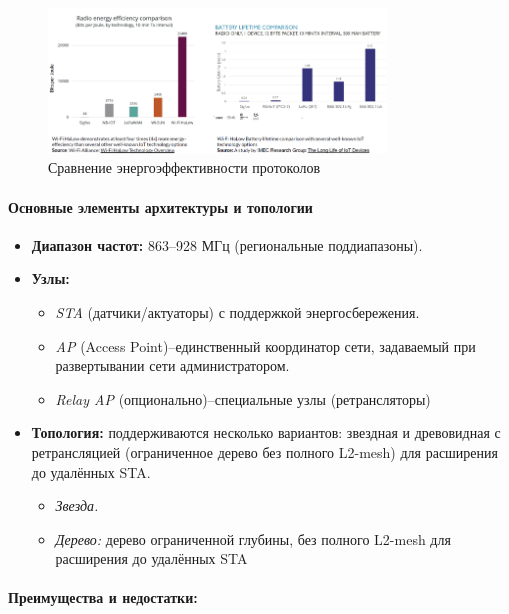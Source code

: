 \documentclass[14pt, a4paper]{extreport}
\begin{document}
\begin{figure}[ht]
    \centering
    \includegraphics[width=0.8\textwidth]{images/WiFiEnergyEff.png}
    \caption{Сравнение энергоэффективности протоколов \cite{IMG_protocol_compare_power_eff}}
    \label{fig:wifi_energy_eff}
\end{figure}

\paragraph{Основные элементы архитектуры и топологии}
\begin{itemize}
  \item \textbf{Диапазон частот:} 863–928 МГц (региональные поддиапазоны).
  \item \textbf{Узлы:} 
    \begin{itemize}
      \item \emph{STA} (датчики/актуаторы) с поддержкой энергосбережения.
      \item \emph{AP} (Access Point)--единственный координатор сети, задаваемый при развертывании сети администратором.
      \item \emph{Relay AP} (опционально)--специальные узлы (ретрансляторы)
    \end{itemize}
  \item \textbf{Топология:} поддерживаются несколько вариантов: звездная и древовидная с ретрансляцией (ограниченное дерево без полного L2-mesh) для расширения до удалённых STA.
    \begin{itemize}
      \item \emph{Звезда.}
      \item \emph{Дерево:} дерево ограниченной глубины, без полного L2-mesh для расширения до удалённых STA
    \end{itemize}
\end{itemize}

\paragraph{Преимущества и недостатки:}
\end{document}
